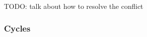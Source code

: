 TODO: talk about how to resolve the conflict








\subsubsection{Cycles}%
\label{sub:Multi-User Cycles}

\figureCycle

